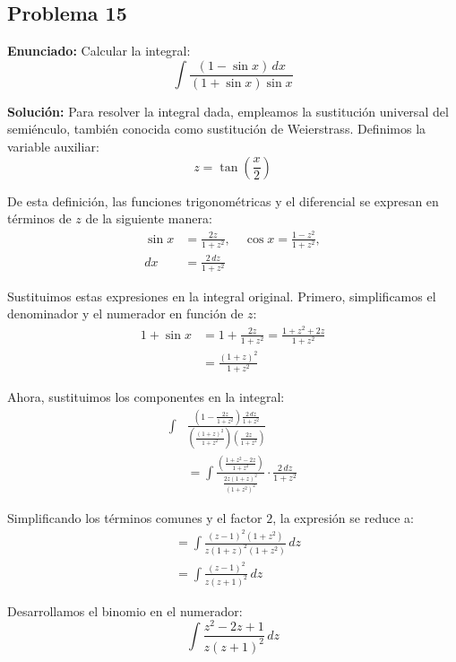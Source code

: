 \subsection*{Problema 15}

\textbf{Enunciado:} Calcular la integral:
\begin{equation*}
\int \frac{(1 - \sin x) \, dx}{(1 + \sin x)\sin x}
\end{equation*}

\textbf{Solución:} 
Para resolver la integral dada, empleamos la sustitución universal del semiénculo, también conocida como sustitución de Weierstrass. Definimos la variable auxiliar:
\begin{equation*}
z = \tan\left(\frac{x}{2}\right)
\end{equation*}

De esta definición, las funciones trigonométricas y el diferencial se expresan en términos de $z$ de la siguiente manera:
\begin{align*}
\sin x &= \frac{2z}{1 + z^2}, \quad 
\cos x = \frac{1 - z^2}{1 + z^2}, \\
dx &= \frac{2 \, dz}{1 + z^2}
\end{align*}

Sustituimos estas expresiones en la integral original. Primero, simplificamos el denominador y el numerador en función de $z$:
\begin{align*}
1 + \sin x &= 1 + \frac{2z}{1 + z^2} = \frac{1 + z^2 + 2z}{1 + z^2} \\
&= \frac{(1 + z)^2}{1 + z^2}
\end{align*}

Ahora, sustituimos los componentes en la integral:
\begin{align*}
\int &\frac{\left(1 - \frac{2z}{1 + z^2}\right) \frac{2 \, dz}{1 + z^2}}{\left(\frac{(1 + z)^2}{1 + z^2}\right)\left(\frac{2z}{1 + z^2}\right)} \\
&= \int \frac{\left(\frac{1 + z^2 - 2z}{1 + z^2}\right)}{\frac{2z(1 + z)^2}{(1 + z^2)^2}} \cdot \frac{2 \, dz}{1 + z^2}
\end{align*}

Simplificando los términos comunes y el factor $2$, la expresión se reduce a:
\begin{align*}
&= \int \frac{(z - 1)^2 (1 + z^2)}{z(1 + z)^2 (1 + z^2)} \, dz \\
&= \int \frac{(z - 1)^2}{z(z + 1)^2} \, dz
\end{align*}

Desarrollamos el binomio en el numerador:
\begin{equation*}
\int \frac{z^2 - 2z + 1}{z(z + 1)^2} \, dz
\end{equation*}

